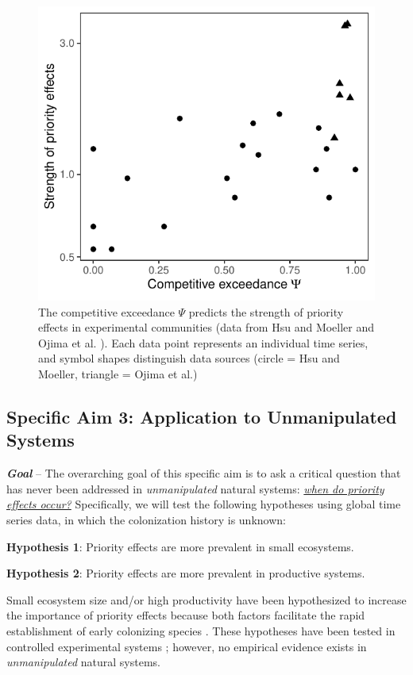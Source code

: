 \documentclass[12pt, class=article, crop=false]{standalone}
\begin{document}
\begin{figure}
    \includegraphics[scale=0.7]{output/figure_exp.pdf}
    \caption{The competitive exceedance $\Psi$ predicts the strength of priority effects in experimental communities (data from Hsu and Moeller \citep{hsu_metabolic_2021} and Ojima et al. \citep{ojima_priority_2022}).
    Each data point represents an individual time series, and symbol shapes distinguish data sources (circle = Hsu and Moeller, triangle = Ojima et al.)}
    \label{fig:experiment}
\end{figure}

\subsection*{Specific Aim 3: Application to Unmanipulated Systems}

\textbf{\textit{Goal}} -- 
The overarching goal of this specific aim is to ask a critical question that has never been addressed in \textit{unmanipulated} natural systems: \ul{\textit{when do priority effects occur?}} Specifically, we will test the following hypotheses using global time series data, in which the colonization history is unknown:

\textbf{Hypothesis 1}: Priority effects are more prevalent in small ecosystems.

\textbf{Hypothesis 2}: Priority effects are more prevalent in productive systems.

Small ecosystem size and/or high productivity have been hypothesized to increase the importance of priority effects because both factors facilitate the rapid establishment of early colonizing species \citep{fukami_historical_2015}.
These hypotheses have been tested in controlled experimental systems \citep{fukami_assembly_2004, chase_stochastic_2010}; however, no empirical evidence exists in \textit{unmanipulated} natural systems.
\end{document}
